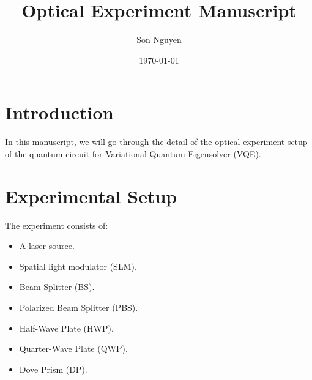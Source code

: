 \documentclass[12pt]{article}
\title{Optical Experiment Manuscript}
\author{Son Nguyen}
\date{\today}
\begin{document}
\maketitle
\section{Introduction}
In this manuscript, we will go through the detail of the optical experiment setup of the quantum circuit for Variational Quantum Eigensolver (VQE).
\section{Experimental Setup}
The experiment consists of:
\begin{itemize}
    \item A laser source.
    \item Spatial light modulator (SLM).
    \item Beam Splitter (BS).
    \item Polarized Beam Splitter (PBS).
    \item Half-Wave Plate (HWP).
    \item Quarter-Wave Plate (QWP).
    \item Dove Prism (DP).
\end{itemize}
\end{document}
